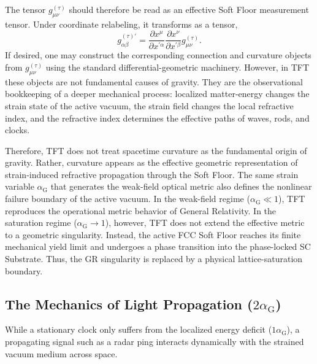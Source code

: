 The tensor $g_{\mu\nu}^{(\tau)}$ should therefore be read as an effective Soft Floor measurement tensor. Under coordinate relabeling, it transforms as a tensor,
\begin{equation}
    g_{\alpha\beta}^{(\tau)\prime} = \frac{\partial x^\mu}{\partial x^{\prime\alpha}} \frac{\partial x^\nu}{\partial x^{\prime\beta}} g_{\mu\nu}^{(\tau)}.
\end{equation}
If desired, one may construct the corresponding connection and curvature objects from $g_{\mu\nu}^{(\tau)}$ using the standard differential-geometric machinery. However, in TFT these objects are not fundamental causes of gravity. They are the observational bookkeeping of a deeper mechanical process: localized matter-energy changes the strain state of the active vacuum, the strain field changes the local refractive index, and the refractive index determines the effective paths of waves, rods, and clocks.

Therefore, TFT does not treat spacetime curvature as the fundamental origin of gravity. Rather, curvature appears as the effective geometric representation of strain-induced refractive propagation through the Soft Floor.
The same strain variable $\alpha_{\mathrm{G}}$ that generates the weak-field optical metric also defines the nonlinear failure boundary of the active vacuum. In the weak-field regime ($\alpha_{\mathrm{G}} \ll 1$), TFT reproduces the operational metric behavior of General Relativity. In the saturation regime ($\alpha_{\mathrm{G}} \to 1$), however, TFT does not extend the effective metric to a geometric singularity. Instead, the active FCC Soft Floor reaches its finite mechanical yield limit and undergoes a phase transition into the phase-locked SC Substrate. Thus, the GR singularity is replaced by a physical lattice-saturation boundary.

\subsection{The Mechanics of Light Propagation ($2\alpha_{\mathrm{G}}$)}
\label{sec:lightspeed_mechanics}
While a stationary clock only suffers from the localized energy deficit ($1\alpha_{\mathrm{G}}$), a propagating signal such as a radar ping interacts dynamically with the strained vacuum medium across space.
\vspace{0.5em}

